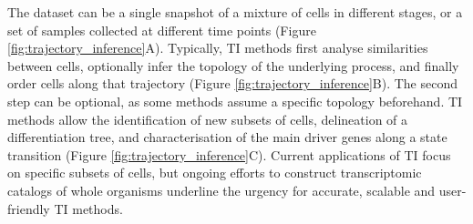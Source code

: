 
The dataset can be a single snapshot of a mixture of cells in different stages, or a set of samples collected at different time points (Figure \ref{fig:trajectory_inference}A). Typically, TI methods first analyse similarities between cells, optionally infer the topology of the underlying process, and finally order cells along that trajectory (Figure \ref{fig:trajectory_inference}B). The second step can be optional, as some methods assume a specific topology beforehand.
TI methods allow the identification of new subsets of cells, delineation of a differentiation tree, and characterisation of the main driver genes along a state transition (Figure \ref{fig:trajectory_inference}C). Current applications of TI focus on specific subsets of cells, but ongoing efforts to construct transcriptomic catalogs of whole organisms \cite{regev_humancellatlas_2017,han_mappingmousecell_2018,schaum_singlecelltranscriptomics20_2018} underline the urgency for accurate, scalable \cite{aibar_scenicsinglecellregulatory_2017,angerer_singlecellsmake_2017} and user-friendly TI methods.


